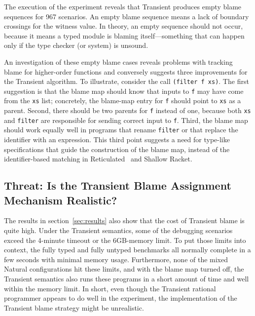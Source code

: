 The execution of the experiment reveals that Transient produces empty blame
sequences for 967 scenarios. An empty blame sequence means a lack of boundary
crossings for the witness value. In theory, an empty sequence should not occur,
because it means a typed module is blaming itself---something that can happen only
if the type checker (or system) is unsound.

An investigation of these empty blame cases reveals problems with tracking blame
for higher-order functions and conversely suggests three improvements for the
Transient algorithm. To illustrate, consider the call \texttt{(filter f xs)}.
The first suggestion is that the blame map should know that inputs to
\texttt{f} may have come from the \texttt{xs} list; concretely, the blame-map
entry for \texttt{f} should point to \texttt{xs} as a parent.
Second, there should be two parents for \texttt{f} instead of one, because
both \texttt{xs} and \texttt{filter} are responsible for sending correct input
to \texttt{f}. Third, the blame map should work equally well in programs
that rename \texttt{filter} or that replace the identifier with
an expression. This third point suggests a need for type-like specifications
that guide the construction of the blame map, instead of the identifier-based
matching in Reticulated~\cite{vss-popl-2017} and Shallow Racket.

\subsection{Threat: Is the Transient Blame Assignment Mechanism Realistic?}
\label{sec:threat:transient2}

The results in section~\ref{sec:results} also show that the cost of Transient
blame is quite high. Under the Transient semantics, some of the debugging
scenarios exceed the 4-minute timeout or the 6GB-memory limit. To put those
limits into context, the fully typed and fully untyped benchmarks all normally complete
in a few seconds with minimal memory usage. Furthermore, none of the mixed
Natural configurations hit these limits, and with the blame map turned off,
the Transient semantics also runs these programs in a short amount of time and
well within the memory limit. In short, even though the Transient rational
programmer appears to do well in the experiment, the implementation of the
Transient blame strategy might be unrealistic. 

